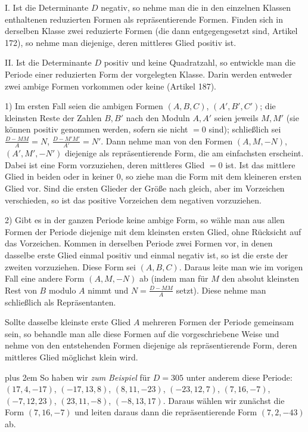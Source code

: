 I. Ist die Determinante $D$ negativ, so nehme man die in den einzelnen Klassen enthaltenen reduzierten Formen als repräsentierende Formen. Finden sich in derselben Klasse zwei reduzierte Formen (die dann entgegengesetzt sind, Artikel 172), so nehme man diejenige, deren mittleres Glied positiv ist.

II. Ist die Determinante $D$ positiv und keine Quadratzahl, so entwickle man die Periode einer reduzierten Form der vorgelegten Klasse. Darin werden entweder zwei ambige Formen vorkommen oder keine (Artikel 187).

1) Im ersten Fall seien die ambigen Formen $(A,B,C)$, $(A',B',C')$; die kleinsten Reste der Zahlen $B,B'$ nach den Moduln $A,A'$ seien jeweils $M,M'$ (sie können positiv genommen werden, sofern sie nicht $=0$ sind); schließlich sei $\frac{D-MM}{A}=N$, $\frac{D-M'M'}{A'}=N'$. Dann nehme man von den Formen $(A,M,-N)$, $(A',M',-N')$ diejenige als repräsentierende Form, die am einfachsten erscheint. Dabei ist eine Form vorzuziehen, deren mittleres Glied $=0$ ist. Ist das mittlere Glied in beiden oder in keiner $0$, so ziehe man die Form mit dem kleineren ersten Glied vor. Sind die ersten Glieder der Größe nach gleich, aber im Vorzeichen verschieden, so ist das positive Vorzeichen dem negativen vorzuziehen.

2) Gibt es in der ganzen Periode keine ambige Form, so wähle man aus allen Formen der Periode diejenige mit dem kleinsten ersten Glied, ohne Rücksicht auf das Vorzeichen. Kommen in derselben Periode zwei Formen vor, in denen dasselbe erste Glied einmal positiv und einmal negativ ist, so ist die erste der zweiten vorzuziehen. Diese Form sei $(A,B,C)$. Daraus leite man wie im vorigen Fall eine andere Form $(A,M,-N)$ ab (indem man für $M$ den absolut kleinsten Rest von $B$ modulo $A$ nimmt und $N=\frac{D-MM}{A}$ setzt). Diese nehme man schließlich als Repräsentanten.

Sollte dasselbe kleinste erste Glied $A$ mehreren Formen der Periode gemeinsam sein, so behandle man alle diese Formen auf die vorgeschriebene Weise und nehme von den entstehenden Formen diejenige als repräsentierende Form, deren mittleres Glied möglichst klein wird.

{\rightskip=0pt plus 2em So haben wir \textit{zum Beispiel} für $D=305$ unter anderem diese Periode: $(17,4,-17)$, $(-17,13,8)$, $(8,11,-23)$, $(-23,12,7)$, $(7,16,-7)$, $(-7,12,23)$, $(23,11,-8)$, $(-8,13,17)$. Daraus wählen wir zunächst die Form $(7,16,-7)$ und leiten daraus dann die repräsentierende Form $(7,2,-43)$ ab.\par}

